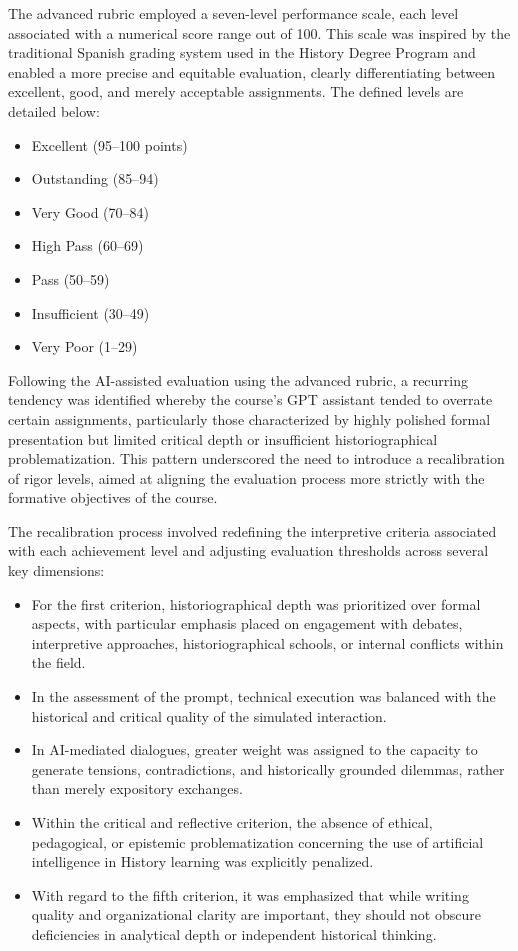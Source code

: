 \documentclass[english]{textolivre}
\begin{document}
The advanced rubric employed a seven-level performance scale, each level associated with a numerical score range out of 100. This scale was inspired by the traditional Spanish grading system used in the History Degree Program and enabled a more precise and equitable evaluation, clearly differentiating between excellent, good, and merely acceptable assignments. The defined levels are detailed below:

\begin{itemize}
    \item Excellent (95–100 points)
    \item Outstanding (85–94)
    \item Very Good (70–84)
    \item High Pass (60–69)
    \item Pass (50–59)
    \item Insufficient (30–49)
    \item Very Poor (1–29)
\end{itemize}

Following the AI-assisted evaluation using the advanced rubric, a recurring tendency was identified whereby the course's GPT assistant tended to overrate certain assignments, particularly those characterized by highly polished formal presentation but limited critical depth or insufficient historiographical problematization. This pattern underscored the need to introduce a recalibration of rigor levels, aimed at aligning the evaluation process more strictly with the formative objectives of the course.

The recalibration process involved redefining the interpretive criteria associated with each achievement level and adjusting evaluation thresholds across several key dimensions:

\begin{itemize}
    \item For the first criterion, historiographical depth was prioritized over formal aspects, with particular emphasis placed on engagement with debates, interpretive approaches, historiographical schools, or internal conflicts within the field.
    \item In the assessment of the prompt, technical execution was balanced with the historical and critical quality of the simulated interaction.
    \item In AI-mediated dialogues, greater weight was assigned to the capacity to generate tensions, contradictions, and historically grounded dilemmas, rather than merely expository exchanges.
    \item Within the critical and reflective criterion, the absence of ethical, pedagogical, or epistemic problematization concerning the use of artificial intelligence in History learning was explicitly penalized.
    \item With regard to the fifth criterion, it was emphasized that while writing quality and organizational clarity are important, they should not obscure deficiencies in analytical depth or independent historical thinking.
\end{itemize}
\end{document}
